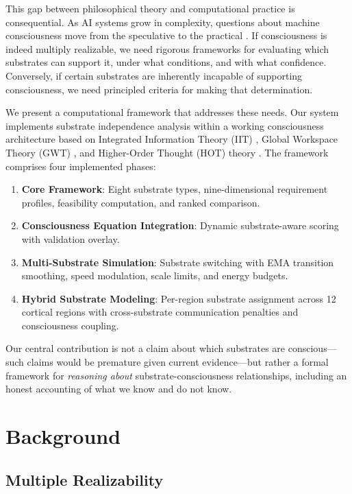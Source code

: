 \documentclass[12pt,a4paper]{article}
\begin{document}
This gap between philosophical theory and computational practice is consequential. As AI systems grow in complexity, questions about machine consciousness move from the speculative to the practical \citep{chalmers2010character, schwitzgebel2023ai}. If consciousness is indeed multiply realizable, we need rigorous frameworks for evaluating which substrates can support it, under what conditions, and with what confidence. Conversely, if certain substrates are inherently incapable of supporting consciousness, we need principled criteria for making that determination.

We present a computational framework that addresses these needs. Our system implements substrate independence analysis within a working consciousness architecture based on Integrated Information Theory (IIT) \citep{tononi2004information}, Global Workspace Theory (GWT) \citep{baars1988cognitive}, and Higher-Order Thought (HOT) theory \citep{rosenthal2005consciousness}. The framework comprises four implemented phases:

\begin{enumerate}
    \item \textbf{Core Framework}: Eight substrate types, nine-dimensional requirement profiles, feasibility computation, and ranked comparison.
    \item \textbf{Consciousness Equation Integration}: Dynamic substrate-aware scoring with validation overlay.
    \item \textbf{Multi-Substrate Simulation}: Substrate switching with EMA transition smoothing, speed modulation, scale limits, and energy budgets.
    \item \textbf{Hybrid Substrate Modeling}: Per-region substrate assignment across 12 cortical regions with cross-substrate communication penalties and consciousness coupling.
\end{enumerate}

Our central contribution is not a claim about which substrates are conscious---such claims would be premature given current evidence---but rather a formal framework for \emph{reasoning about} substrate-consciousness relationships, including an honest accounting of what we know and do not know.

\section{Background}

\subsection{Multiple Realizability}
\end{document}

